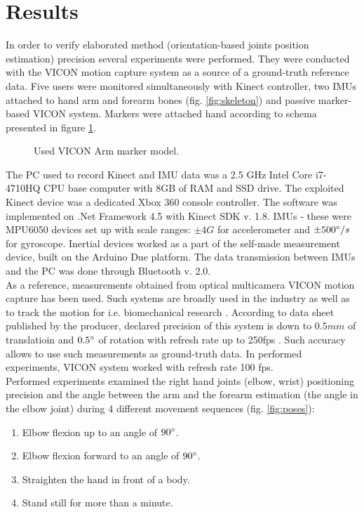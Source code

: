 \documentclass[9pt]{llncs}
\begin{document}
\section{Results}
In order to verify elaborated method (orientation-based joints position estimation) precision several experiments were performed. They were conducted with the VICON motion capture system as a source of a ground-truth reference data. Five users were monitored simultaneously with Kinect controller, two IMUs attached to hand arm and forearm bones (fig. \ref{fig:skeleton}) and passive marker-based VICON system. Markers were attached hand according to schema presented in figure \ref{fig:viconArm}.\\
\begin{figure}[H]
	\vspace{2.5cm}
	\caption[VICON arm marker schema]{Used VICON Arm marker model.\footnotemark}
	\label{fig:viconArm}
\end{figure}
The PC used to record Kinect and IMU data was a 2.5 GHz Intel Core i7-4710HQ CPU base computer with 8GB of RAM and SSD drive. The exploited Kinect device was a dedicated Xbox 360 console controller. The software was implemented on .Net Framework 4.5 with Kinect SDK v. 1.8. IMUs - these were MPU6050 devices set up with scale ranges: $\pm 4G$ for accelerometer and $\pm 500\degree /s$ for gyroscope. Inertial devices worked as a part of the self-made measurement device, built on the Arduino Due platform. The data transmission between IMUs and the PC was done through Bluetooth v. 2.0.\\
As a reference, measurements obtained from optical multicamera VICON motion capture has been used. Such systems are broadly used in the industry as well as to track the motion for i.e. biomechanical research \cite{ViconCaseStudeis}. According to data sheet published by the producer, declared precision of this system is down to $0.5mm$ of translatioin and $0.5\degree$ of rotation with refresh rate up to 250fps \cite{Vicon2016}. Such accuracy allows to use such measurements as ground-truth data. In performed experiments, VICON system worked with refresh rate 100 fps.\\
Performed experiments examined the right hand joints (elbow, wrist) positioning precision and the angle between the arm and the forearm estimation (the angle in the elbow joint) during 4 different movement sequences (fig. \ref{fig:poses}):
\begin{enumerate}
	\item Elbow flexion up to an angle of $90\degree$.
	\item Elbow flexion forward to an angle of $90\degree$.
	\item Straighten the hand in front of a body.
	\item Stand still for more than a minute.
\end{enumerate}
\end{document}
